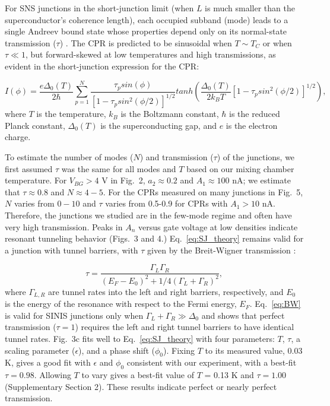 \documentclass[11pt]{article}
\begin{document}
For SNS junctions in the short-junction limit (when $L$ is much smaller than the superconductor's coherence length), each occupied subband (mode) leads to a single Andreev bound state whose properties depend only on its normal-state transmission ($\tau$) . The CPR is predicted to be sinusoidal when $T \sim T_C$ or when $\tau\ll 1$, but forward-skewed at low temperatures and high transmissions, as evident in the short-junction expression for the CPR:

\begin{equation}\label{eq:SJ_theory}
I(\phi) = \frac{e \Delta_0(T)}{2 \hbar} \sum_{p=1}^{N} \frac{\tau_p sin(\phi)}{[1-\tau_p sin^2(\phi/2)]^{1/2}} tanh(\frac{\Delta_0(T)}{2 k_B T} [1-\tau_p sin^2(\phi/2)]^{1/2}), 
\end{equation} where $T$ is the temperature, $k_B$ is the Boltzmann constant, $\hbar$ is the reduced Planck constant, $\Delta_0(T)$ is the superconducting gap, and $e$ is the electron charge. 

To estimate the number of modes ($N$) and transmission ($\tau$) of the junctions, we first assumed $\tau$ was the same for all modes and $T$ based on our mixing chamber temperature. For $V_{BG} > 4$ V in Fig.~2, $a_2 \approx 0.2$ and $A_1 \approx 100$ nA; we estimate that $\tau \approx 0.8$ and $N \approx 4-5$. For the CPRs measured on many junctions in Fig.~5, $N$ varies from $0-10$ and $\tau$ varies from 0.5-0.9 for CPRs with $A_1 > 10$ nA. Therefore, the junctions we studied are in the few-mode regime and often have very high transmission.
Peaks in $A_n$ versus gate voltage at low densities indicate resonant tunneling behavior (Figs.~3 and 4.) Eq.~\ref{eq:SJ_theory} remains valid for a junction with tunnel barriers, with $\tau$ given by the Breit-Wigner transmission :

\begin{equation}\label{eq:BW}
\tau = \frac{\Gamma_L \Gamma_R}{(E_F-E_0)^2+1/4(\Gamma_L+\Gamma_R)^2}, 
\end{equation} where $\Gamma_{L,R}$ are tunnel rates into the left and right barriers, respectively, and $E_0$ is the energy of the resonance with respect to the Fermi energy, $E_F$. Eq.~\ref{eq:BW} is valid for SINIS junctions only when $\Gamma_L + \Gamma_R \gg \Delta_0$ and shows that perfect transmission ($\tau =1$) requires the left and right tunnel barriers to have identical tunnel rates.
Fig.~3c fits well to Eq.~\ref{eq:SJ_theory} with four parameters: $T$, $\tau$, a scaling parameter ($\epsilon$), and a phase shift ($\phi_0$). Fixing $T$ to its measured value, 0.03 K, gives a good fit with $\epsilon$ and $\phi_0$ consistent with our experiment, with a best-fit $\tau = 0.98$. Allowing $T$ to vary gives a best-fit value of $T$ = 0.13 K and $\tau = 1.00$ (Supplementary Section 2). These results indicate perfect or nearly perfect transmission.
\end{document}
